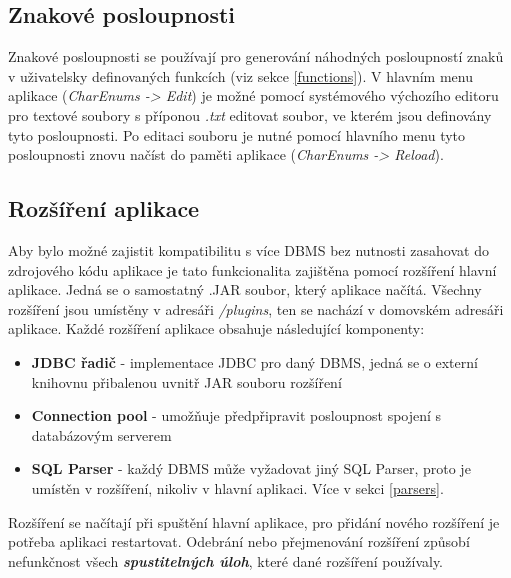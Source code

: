 \documentclass[czech,bachelor,public,dept460,male,cpdeclaration,twoside]{diploma}
\begin{document}
\subsection{Znakové posloupnosti} \label{charenums}
Znakové posloupnosti se používají pro generování náhodných posloupností znaků v uživatelsky definovaných funkcích (viz sekce \ref{functions}). V hlavním menu aplikace (\textit{CharEnums -> Edit}) je možné pomocí systémového výchozího editoru pro textové soubory s příponou \textit{.txt} editovat soubor, ve kterém jsou definovány tyto posloupnosti. Po editaci souboru je nutné pomocí hlavního menu tyto posloupnosti znovu načíst do paměti aplikace (\textit{CharEnums -> Reload}).

\subsection{Rozšíření aplikace} \label{plugins}
Aby bylo možné zajistit kompatibilitu s více DBMS bez nutnosti zasahovat do zdrojového kódu aplikace je tato funkcionalita zajištěna pomocí rozšíření hlavní aplikace. Jedná se o samostatný .JAR soubor, který aplikace načítá. Všechny rozšíření jsou umístěny v adresáři \textit{/plugins}, ten se nachází v domovském adresáři aplikace. Každé rozšíření aplikace obsahuje následující komponenty:
\begin{itemize}
\item \textbf{JDBC řadič} - implementace JDBC pro daný DBMS, jedná se o externí knihovnu přibalenou uvnitř JAR souboru rozšíření
\item \textbf{Connection pool} - umožňuje předpřipravit posloupnost spojení s databázovým serverem
\item \textbf{SQL Parser} - každý DBMS může vyžadovat jiný SQL Parser, proto je umístěn v rozšíření, nikoliv v hlavní aplikaci. Více v sekci \ref{parsers}. 
\end{itemize}


Rozšíření se načítají při spuštění hlavní aplikace, pro přidání nového rozšíření je potřeba aplikaci restartovat. Odebrání nebo přejmenování rozšíření způsobí nefunkčnost všech \textbf{\emph{spustitelných úloh}}, které dané rozšíření používaly.
\end{document}
